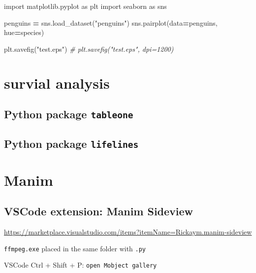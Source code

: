 \documentclass[
]{book}
\newenvironment{Shaded}{\begin{snugshade}}{\end{snugshade}}
\newcommand{\CommentTok}[1]{\textcolor[rgb]{0.56,0.35,0.01}{\textit{#1}}}
\newcommand{\ImportTok}[1]{#1}
\newcommand{\NormalTok}[1]{#1}
\newcommand{\OperatorTok}[1]{\textcolor[rgb]{0.81,0.36,0.00}{\textbf{#1}}}
\newcommand{\StringTok}[1]{\textcolor[rgb]{0.31,0.60,0.02}{#1}}
\theoremstyle{definition}
\theoremstyle{definition}
\theoremstyle{definition}
\theoremstyle{definition}
\theoremstyle{remark}
\begin{document}
\begin{Shaded}
\begin{Highlighting}[]
\ImportTok{import}\NormalTok{ matplotlib.pyplot }\ImportTok{as}\NormalTok{ plt}
\ImportTok{import}\NormalTok{ seaborn }\ImportTok{as}\NormalTok{ sns}

\NormalTok{penguins }\OperatorTok{=}\NormalTok{ sns.load\_dataset(}\StringTok{"penguins"}\NormalTok{)}
\NormalTok{sns.pairplot(data}\OperatorTok{=}\NormalTok{penguins,}
\NormalTok{             hue}\OperatorTok{=}\StringTok{\textquotesingle{}species\textquotesingle{}}\NormalTok{)}

\NormalTok{plt.savefig(}\StringTok{"test.eps"}\NormalTok{)}
\CommentTok{\# plt.savefig("test.eps", dpi=1200)}
\end{Highlighting}
\end{Shaded}

\chapter{survial analysis}\label{survial-analysis}

\section{\texorpdfstring{Python package \texttt{tableone}}{Python package tableone}}\label{python-package-tableone}

\section{\texorpdfstring{Python package \texttt{lifelines}}{Python package lifelines}}\label{python-package-lifelines}

\chapter{Manim}\label{manim}

\section{VSCode extension: Manim Sideview}\label{vscode-extension-manim-sideview}

\url{https://marketplace.visualstudio.com/items?itemName=Rickaym.manim-sideview}

\texttt{ffmpeg.exe} placed in the same folder with \texttt{.py}

VSCode Ctrl + Shift + P: \texttt{open\ Mobject\ gallery}
\end{document}
